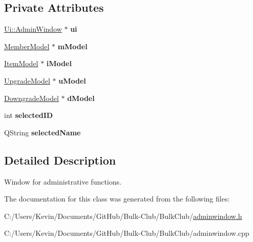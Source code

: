 \subsection*{Private Attributes}
\begin{DoxyCompactItemize}
\item 
\mbox{\label{class_admin_window_a3fa27571cf4952084a71a6fdc9b070b2}} 
\mbox{\hyperlink{class_ui_1_1_admin_window}{Ui\+::\+Admin\+Window}} $\ast$ {\bfseries ui}
\item 
\mbox{\label{class_admin_window_aa5a6a48c6da316befcb677ef4a372d17}} 
\mbox{\hyperlink{class_member_model}{Member\+Model}} $\ast$ {\bfseries m\+Model}
\item 
\mbox{\label{class_admin_window_adac3343d645364a16cf8a970a3e8b12a}} 
\mbox{\hyperlink{class_item_model}{Item\+Model}} $\ast$ {\bfseries i\+Model}
\item 
\mbox{\label{class_admin_window_a1f486154ede97643b14c5cdbbbc81979}} 
\mbox{\hyperlink{class_upgrade_model}{Upgrade\+Model}} $\ast$ {\bfseries u\+Model}
\item 
\mbox{\label{class_admin_window_aa3b441553db7ec8a809f173824942ba4}} 
\mbox{\hyperlink{class_downgrade_model}{Downgrade\+Model}} $\ast$ {\bfseries d\+Model}
\item 
\mbox{\label{class_admin_window_a019852d3390ef26cb634709e41f59764}} 
int {\bfseries selected\+ID}
\item 
\mbox{\label{class_admin_window_a13177aa3fd835f2fb9eecbfa86f8b465}} 
Q\+String {\bfseries selected\+Name}
\end{DoxyCompactItemize}


\subsection{Detailed Description}
Window for administrative functions. 

The documentation for this class was generated from the following files\+:\begin{DoxyCompactItemize}
\item 
C\+:/\+Users/\+Kevin/\+Documents/\+Git\+Hub/\+Bulk-\/\+Club/\+Bulk\+Club/\mbox{\hyperlink{adminwindow_8h}{adminwindow.\+h}}\item 
C\+:/\+Users/\+Kevin/\+Documents/\+Git\+Hub/\+Bulk-\/\+Club/\+Bulk\+Club/adminwindow.\+cpp\end{DoxyCompactItemize}
